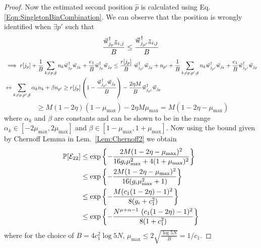 \begin{proof}
	Now the estimated second position $\hat{p}$ is calculated using Eq. \eqref{Eqn:SingletonBinCombination}. We can observe that the position is wrongly identified when $\exists p'$ such that
	\[ \frac{\vec{\mathrm{w}}_{j_p}^{\dagger}\underline{z}_{i,j}}{B} \leq \frac{\vec{\mathrm{w}}_{j_{p'}}^{\dagger}\underline{z}_{i,j}}{B}\]
	\begin{align*}
		&\implies r[j_p] + \frac{1}{B}\sum_{k \neq p, \tilde{p}} n_k 	\vec{\mathrm{w}}_{j_p}^{\dagger}\vec{\mathrm{w}}_{j_k} + \frac{e_1}{B} \vec{\mathrm{w}}_{j_p}^{\dagger}\vec{\mathrm{w}}_{j_{\tilde{p}}}  \leq \frac{r[j_p]}{B} ~ \vec{\mathrm{w}}_{j_{p'}}^{\dagger}\vec{\mathrm{w}}_{j_p}+ n_{p'}+\frac{1}{B}\sum_{k \neq p,p',\tilde{p}}n_k\vec{\mathrm{w}}_{j_{p'}}^{\dagger} \vec{\mathrm{w}}_{j_k} + \frac{e_1}{B} \vec{\mathrm{w}}_{j_{p'}}^{\dagger}\vec{\mathrm{w}}_{j_{\tilde{p}}}\\
		&\leftrightarrow \sum_{k \neq p,p',\tilde{p}}\alpha_k n_k+ \beta n_{p'}  \geq  r[j_p]\left(1-\frac{\vec{\mathrm{w}}_{j_{p'}}^{\dagger}\vec{\mathrm{w}}_{j_p}}{B}\right) - \frac{2 \eta M}{B} \vec{\mathrm{w}}_{j_{p'}}^{\dagger}\vec{\mathrm{w}}_{j_{\tilde{p}}}
	\end{align*}
	\[~~\geq M(1-2\eta)(1-\mu_{\text{max}}) - 2 \eta M \mu_{\text{max}} = M(1 - 2\eta - \mu_{\text{max}})                         
	\]
	where $\alpha_k$ and $\beta$ are constants and can be shown to be in the range $\alpha_k\in[-2\mu_\text{max},2\mu_\text{max}]$ and $\beta\in[1-\mu_\text{max},1+\mu_\text{max}]$. Now using the bound given by Chernoff Lemma in Lem.~\ref{Lem:Chernoff2} we obtain
	\begin{align*}
		\mathbb{P}[\mathcal{E}_{22}]&\leq \exp\left\lbrace-\frac{2M(1 - 2\eta - \mu_{\text{max}})^2}{16g_i\mu^2_{\max}+4(1+\mu_{\max})^2}\right\rbrace\\
		&\leq\exp\left\lbrace-\frac{2M(1 - 2\eta - \mu_{\text{max}})^2}{16(g_i\mu^2_{\max}+1)}\right\rbrace\\
		&\leq\exp\left\lbrace-\frac{M(c_1(1 - 2\eta) - 1)^2}{8(g_i+c_1^2)}\right\rbrace\\
		&\leq\exp\left\lbrace-\frac{N^{\mu+\alpha-1} ~ (c_1(1 - 2\eta) - 1)^2}{8(1+ c_1^2)}\right\rbrace\\
	\end{align*}
	where for the choice of $B=4c_1^2\log 5N$, $\mu_{\max}\leq 2\sqrt{\frac{\log 5N}{B}} = 1/c_1$.
	
\end{proof}


